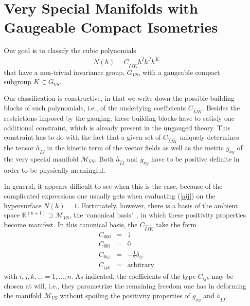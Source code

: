 \documentclass[a4paper,11pt]{article}
\newcommand{\nn}{\nonumber}
\newcommand{\ti}{\ensuremath{\tilde{I}}}
\newcommand{\tj}{\ensuremath{\tilde{J}}}
\newcommand{\tk}{\ensuremath{\tilde{K}}}
\newcommand{\M}{\ensuremath{\mathcal{M}}}
\begin{document}
\section{Very Special Manifolds with Gaugeable Compact Isometries}
\setcounter{equation}{0}



Our goal is to classify the cubic polynomials
\begin{displaymath}
N(h)=C_{\ti\tj\tk}h^{\ti}
h^{\tj}h^{\tk}
\end{displaymath}
that have a non-trivial invariance group, $G_{VS}$,  with a
gaugeable compact subgroup $K\subset G_{VS}$.

Our classification is constructive, in that we write down the possible
building blocks of such polynomials, i.e., of the underlying coefficients
$C_{\ti\tj\tk}$. Besides the restrictions imposed by the gauging, these
building blocks have to satisfy one additional constraint, which is
already present in the ungauged theory. This constraint has to do with the
fact that a given set of $C_{\ti\tj\tk}$ uniquely determines the tensor
${\stackrel{\circ}{a}}_{\ti\tj}$ in the kinetic term of the vector fields
as well as the metric $g_{xy}$ of the very special manifold $\M_{VS}$.
Both ${\stackrel{\circ}{a}}_{\ti\tj}$ and $g_{xy}$ have to be positive
definite in order to be physically meaningful. 

In general, it appears difficult to see when this is
the case, because of the complicated expressions one usually gets when
evaluating (\ref{aij}) on the hypersurface $N(h)=1$. 
Fortunately, however, there is a
basis of the ambient space ${\mathbb{R}}^{(n+1)}\supset \M_{VS}$,
the `canonical basis'~\cite{GST1}, in which these
positivity properties become manifest.
In this canonical basis, the $C_{\ti\tj\tk}$ take the form
\begin{eqnarray}
C_{000}&=&  1  \nn \\
C_{00i}&=& 0  \nn \\
C_{0ij}&=& -\frac{1}{2} \delta_{ij}
\label{canonical2}\\
C_{ijk}&=&\textrm{arbitrary} \nn
\end{eqnarray}
with $i,j,k,\ldots=1,\ldots,n$. 
As indicated, the coefficients of the type
$C_{ijk}$  may be chosen at will, i.e., they parametrize  the remaining 
freedom
one has in deforming the manifold $\M_{VS}$ without spoiling
the positivity properties of $g_{xy}$ and ${\stackrel{\circ}{a}}_{\ti\tj}$.
\end{document}
